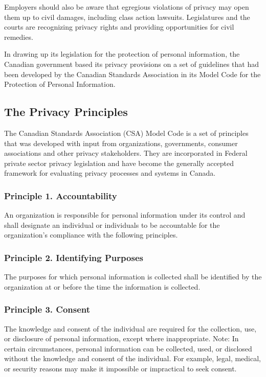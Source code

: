 \documentclass[letterpaper,10pt,english]{sphinxmanual}
\begin{document}
\sphinxAtStartPar
Employers should also be aware that egregious violations of privacy may open them up to
civil damages, including class action lawsuits. Legislatures and the courts are recognizing
privacy rights and providing opportunities for civil remedies.

\sphinxAtStartPar
In drawing up its legislation for the protection of personal information, the Canadian
government based its privacy provisions on a set of guidelines that had been developed by
the Canadian Standards Association in its Model Code for the Protection of Personal
Information.


\subsection{The Privacy Principles}
\label{\detokenize{2_compliance:the-privacy-principles}}
\sphinxAtStartPar
The Canadian Standards Association (CSA) Model Code is a set of principles that was
developed with input from organizations, governments, consumer associations and other
privacy stakeholders. They are incorporated in Federal private sector privacy legislation and
have become the generally accepted framework for evaluating privacy processes and systems
in Canada.


\subsubsection{Principle 1. Accountability}
\label{\detokenize{2_compliance:principle-1-accountability}}
\sphinxAtStartPar
An organization is responsible for personal information under its control and shall designate
an individual or individuals to be accountable for the organization’s compliance with the
following principles.


\subsubsection{Principle 2. Identifying Purposes}
\label{\detokenize{2_compliance:principle-2-identifying-purposes}}
\sphinxAtStartPar
The purposes for which personal information is collected shall be identified by the
organization at or before the time the information is collected.


\subsubsection{Principle 3. Consent}
\label{\detokenize{2_compliance:principle-3-consent}}
\sphinxAtStartPar
The knowledge and consent of the individual are required for the collection, use, or
disclosure of personal information, except where inappropriate. Note: In certain
circumstances, personal information can be collected, used, or disclosed without the
knowledge and consent of the individual. For example, legal, medical, or security reasons
may make it impossible or impractical to seek consent.
\end{document}
